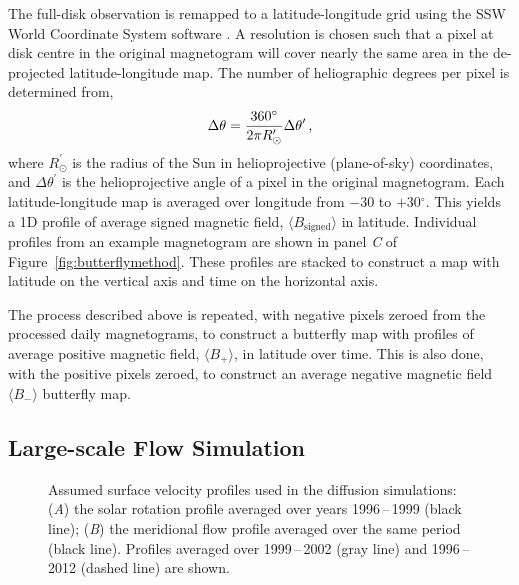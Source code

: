 The full-disk observation is remapped to a latitude-longitude grid using the SSW World Coordinate System software \citep{Thompson:2006}. A resolution is chosen such that a pixel at disk centre in the original magnetogram will cover nearly the same area in the de-projected latitude-longitude map. The number of heliographic degrees per pixel is determined from,
\begin{equation}
\Delta \theta =\frac{360^\circ}{2\pi R^{\prime}_\odot} \Delta \theta^{\prime} \mbox{\,,}
\end{equation}
where $R^\prime_\odot$ is the radius of the Sun in helioprojective (plane-of-sky) coordinates, and $\Delta \theta^\prime$ is the helioprojective angle of a pixel in the original magnetogram. Each latitude-longitude map is averaged over longitude from $-$30 to $+$30$^{\circ}$. This yields a 1D profile of average signed magnetic field, $\langle B_{\mathrm{signed}} \rangle$ in latitude. 
Individual profiles from an example magnetogram are shown in panel \emph{C} of Figure~\ref{fig:butterflymethod}.
These profiles are stacked to construct a map with latitude on the vertical axis and time on the horizontal axis.%

The process described above is repeated, with negative pixels zeroed from the processed daily magnetograms, to construct a butterfly map with profiles of average positive magnetic field, $\langle B_{+} \rangle$, in latitude over time. This is also done, with the positive pixels zeroed, to construct an average negative magnetic field $\langle B_{-} \rangle$ butterfly map. %

\subsection{Large-scale Flow Simulation}\label{sect:meriddiffinteg}

\begin{figure}[!t]    %
\caption[Assumed surface velocity profiles for the diffusion simulations.]{Assumed surface velocity profiles used in the diffusion simulations: (\emph{A}) the solar rotation profile averaged over years 1996\,--\,1999 (black line); (\emph{B}) the meridional flow profile averaged over the same period (black line). Profiles averaged over 1999\,--\,2002 (gray line) and 1996\,--\,2012 (dashed line) are shown.} %
\label{fig:modelinput}
\end{figure}

